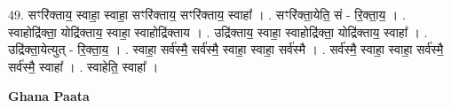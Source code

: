 \documentclass[17pt]{extarticle}
\begin{document}
49. सꣳरि॑क्ताय॒ स्वाहा॒ स्वाहा॒ सꣳरि॑क्ताय॒ सꣳरि॑क्ताय॒ स्वाहा᳚ । . सꣳरि॑क्ता॒येति॒ सं - रि॒क्ता॒य॒ । . स्वाहोद्रि॑क्ता॒ योद्रि॑क्ताय॒ स्वाहा॒ स्वाहोद्रि॑क्ताय । . उद्रि॑क्ताय॒ स्वाहा॒ स्वाहोद्रि॑क्ता॒ योद्रि॑क्ताय॒ स्वाहा᳚ । . उद्रि॑क्ता॒येत्युत् - रि॒क्ता॒य॒ । . स्वाहा॒ सर्व॑स्मै॒ सर्व॑स्मै॒ स्वाहा॒ स्वाहा॒ सर्व॑स्मै । . सर्व॑स्मै॒ स्वाहा॒ स्वाहा॒ सर्व॑स्मै॒ सर्व॑स्मै॒ स्वाहा᳚ । . स्वाहेति॒ स्वाहा᳚ । \newline

\textbf{Ghana Paata } \newline
\end{document}

